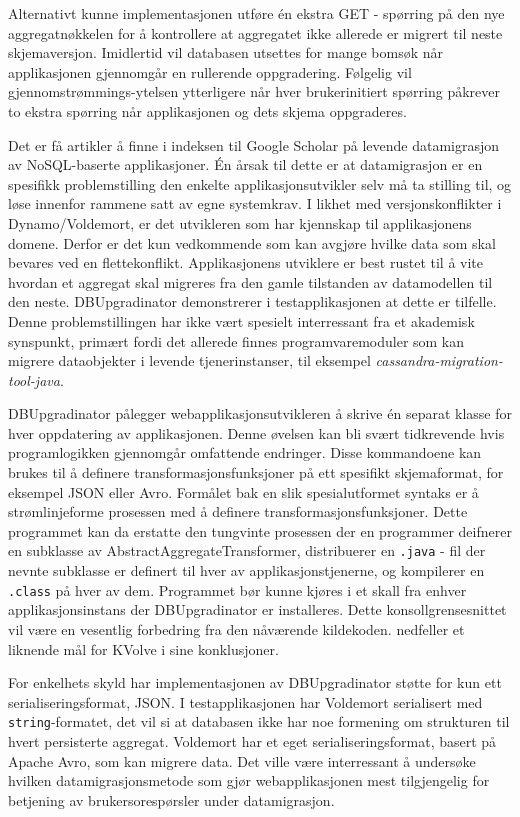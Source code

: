 Alternativt kunne implementasjonen utføre én ekstra GET - spørring på den nye aggregatnøkkelen for å kontrollere at aggregatet ikke allerede er migrert til neste skjemaversjon. Imidlertid vil databasen utsettes for mange bomsøk når applikasjonen gjennomgår en rullerende oppgradering. Følgelig vil gjennomstrømmings-ytelsen ytterligere når hver brukerinitiert spørring påkrever to ekstra spørring når applikasjonen og dets skjema oppgraderes. 

Det er få artikler å finne i indeksen til Google Scholar på levende datamigrasjon av NoSQL-baserte applikasjoner. Én årsak til dette er at datamigrasjon er en spesifikk problemstilling den enkelte applikasjonsutvikler selv må ta stilling til, og løse innenfor rammene satt av egne systemkrav. I likhet med versjonskonflikter i Dynamo/Voldemort, er det utvikleren som har kjennskap til applikasjonens domene. Derfor er det kun vedkommende som kan avgjøre hvilke data som skal bevares ved en flettekonflikt. Applikasjonens utviklere er best rustet til å vite hvordan et aggregat skal migreres fra den gamle tilstanden av datamodellen til den neste. DBUpgradinator demonstrerer i testapplikasjonen at dette er tilfelle. Denne problemstillingen har ikke vært spesielt interressant fra et akademisk synspunkt, primært fordi det allerede finnes programvaremoduler som kan migrere dataobjekter i levende tjenerinstanser, til eksempel \emph{cassandra-migration-tool-java}.

DBUpgradinator pålegger webapplikasjonsutvikleren å skrive én separat klasse for hver oppdatering av applikasjonen. Denne øvelsen kan bli svært tidkrevende hvis programlogikken gjennomgår omfattende endringer. Disse kommandoene kan brukes til å definere transformasjonsfunksjoner på ett spesifikt skjemaformat, for eksempel JSON eller Avro. Formålet bak en slik spesialutformet syntaks er å strømlinjeforme prosessen med å definere transformasjonsfunksjoner. Dette programmet kan da erstatte den tungvinte prosessen der en programmer deifnerer en subklasse av AbstractAggregateTransformer, distribuerer en \texttt{.java} - fil der nevnte subklasse er definert til hver av applikasjonstjenerne, og kompilerer en \texttt{.class} på hver av dem. Programmet bør kunne kjøres i et skall fra enhver applikasjonsinstans der DBUpgradinator er installeres. Dette konsollgrensesnittet vil være en vesentlig forbedring fra den nåværende kildekoden. \cite{saur2016} nedfeller et liknende mål for KVolve i sine konklusjoner.

For enkelhets skyld har implementasjonen av DBUpgradinator støtte for kun ett serialiseringsformat, JSON. I testapplikasjonen har Voldemort serialisert med \texttt{string}-formatet, det vil si at databasen ikke har noe formening om strukturen til hvert persisterte aggregat. Voldemort har et eget serialiseringsformat, basert på Apache Avro, som kan migrere data. Det ville være interressant å undersøke hvilken datamigrasjonsmetode som gjør webapplikasjonen mest tilgjengelig for betjening av brukersorespørsler under datamigrasjon.

\cleardoublepage

